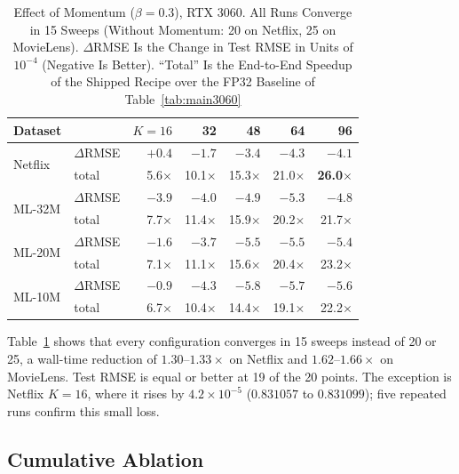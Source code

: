 \begin{table}[!t]
\caption{Effect of Momentum ($\beta=0.3$), RTX 3060. All Runs Converge in 15 Sweeps (Without Momentum: 20 on Netflix, 25 on MovieLens). $\Delta$RMSE Is the Change in Test RMSE in Units of $10^{-4}$ (Negative Is Better). ``Total'' Is the End-to-End Speedup of the Shipped Recipe over the FP32 Baseline of Table~\ref{tab:main3060}}
\label{tab:momentum}
\centering
\footnotesize
\renewcommand{\arraystretch}{1.02}
\setlength{\tabcolsep}{4pt}
\begin{tabular}{llrrrrr}
\toprule
\textbf{Dataset} & & \textbf{$K{=}16$} & \textbf{32} & \textbf{48} & \textbf{64} & \textbf{96} \\
\midrule
\multirow{2}{*}{Netflix}
 & $\Delta$RMSE   & $+0.4$ & $-1.7$ & $-3.4$ & $-4.3$ & $-4.1$ \\
 & total          & 5.6$\times$ & 10.1$\times$ & 15.3$\times$ & 21.0$\times$ & \textbf{26.0$\times$} \\
\midrule
\multirow{2}{*}{ML-32M}
 & $\Delta$RMSE   & $-3.9$ & $-4.0$ & $-4.9$ & $-5.3$ & $-4.8$ \\
 & total          & 7.7$\times$ & 11.4$\times$ & 15.9$\times$ & 20.2$\times$ & 21.7$\times$ \\
\midrule
\multirow{2}{*}{ML-20M}
 & $\Delta$RMSE   & $-1.6$ & $-3.7$ & $-5.5$ & $-5.5$ & $-5.4$ \\
 & total          & 7.1$\times$ & 11.1$\times$ & 15.6$\times$ & 20.4$\times$ & 23.2$\times$ \\
\midrule
\multirow{2}{*}{ML-10M}
 & $\Delta$RMSE   & $-0.9$ & $-4.3$ & $-5.8$ & $-5.7$ & $-5.6$ \\
 & total          & 6.7$\times$ & 10.4$\times$ & 14.4$\times$ & 19.1$\times$ & 22.2$\times$ \\
\bottomrule
\end{tabular}
\end{table}

Table~\ref{tab:momentum} shows that every configuration converges in 15 sweeps instead of 20 or 25, a wall-time reduction of $1.30$--$1.33\times$ on Netflix and $1.62$--$1.66\times$ on MovieLens. Test RMSE is equal or better at 19 of the 20 points. The exception is Netflix $K=16$, where it rises by $4.2 \times 10^{-5}$ ($0.831057$ to $0.831099$); five repeated runs confirm this small loss.

\subsection{Cumulative Ablation}
\label{ssec:ablation}

